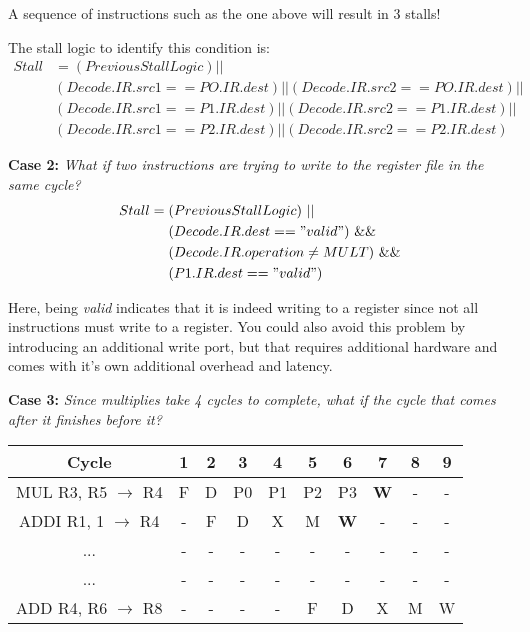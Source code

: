 \documentclass[12pt]{article}
\newenvironment{QandA}{\begin{enumerate}[label=\bfseries\arabic*.]\bfseries}
                      {\end{enumerate}}
\newenvironment{answered}{\par\quad\normalfont}{}
\begin{document}
\begin{QandA}
\begin{answered}
    A sequence of instructions such as the one above will result in 3 stalls!
    
    The stall logic to identify this condition is:
    \begin{equation*}
    \begin{split}
    Stall & = (PreviousStallLogic)|| \\ & (Decode.IR.src1 == PO.IR.dest)||  (Decode.IR.src2 == PO.IR.dest)|| \\ & (Decode.IR.src1 == P1.IR.dest)|| 
    (Decode.IR.src2 == P1.IR.dest)|| \\ & (Decode.IR.src1 == P2.IR.dest)|| 
    (Decode.IR.src2 == P2.IR.dest)
    \end{split}
    \end{equation*}    
    
    \textbf{Case 2:} \textit{What if two instructions are trying to write to the register file in the same cycle?}
    \begin{equation*}
    \begin{split}
    Stall & = (PreviousStallLogic)\ || \\ &\ \ \ \ (Decode.IR.dest == "valid")\ \&\& \\  &\ \ \ \ (Decode.IR.operation \neq MULT)\ \&\& \\ &\ \ \ \  (P1.IR.dest == "valid")
    \end{split}
    \end{equation*}  
    
    Here, being \textit{valid} indicates that it is indeed writing to a register since not all instructions must write to a register. You could also avoid this problem by introducing an additional write port, but that requires additional hardware and comes with it's own additional overhead and latency.
    
    \textbf{Case 3:} \textit{Since multiplies take 4 cycles to complete, what if the cycle that comes after it finishes before it?}
    \begin{center}
    \begin{tabular}{ |c|c|c|c|c|c|c|c|c|c| } 
     \hline
     Cycle & 1 & 2 & 3 & 4 & 5 & 6 & 7 & 8 & 9\\ 
     \hline
     MUL R3, R5 $\rightarrow$ R4 & F & D & P0 & P1 & P2 & P3 & \textbf{W} & - & -\\ 
     ADDI R1, 1 $\rightarrow$ R4 & - & F & D & X & M & \textbf{W} & - & - & - \\ 
     ... & - & - & - & - & - & - & - & - & - \\
     ... & - & - & - & - & - & - & - & - & - \\
     ADD R4, R6 $\rightarrow$ R8 & - & - & - & - & F & D & X & M & W \\ 
     \hline
    \end{tabular}
    \end{center} 
    

\end{answered}
\end{QandA}
\end{document}
